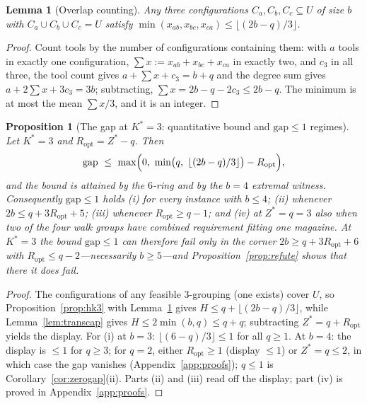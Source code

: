\documentclass[11pt,a4paper]{article}
\theoremstyle{plain}
\newtheorem{lemma}{Lemma}
\newtheorem{proposition}{Proposition}
\theoremstyle{definition}
\theoremstyle{remark}
\newcommand{\U}{U}
\newcommand{\Kst}{K^{\ast}}
\newcommand{\Zst}{Z^{\ast}}
\begin{document}
\begin{lemma}[Overlap counting]\label{lem:overlap}
Any three configurations $C_a,C_b,C_c\subseteq\U$ of size $b$ with
$C_a\cup C_b\cup C_c=\U$ satisfy
$\min(x_{ab},x_{bc},x_{ca})\le\lfloor(2b-q)/3\rfloor$.
\end{lemma}
\begin{proof}
Count tools by the number of configurations containing them: with $a$ tools in
exactly one configuration, $\sum x:=x_{ab}+x_{bc}+x_{ca}$ in exactly two, and
$c_3$ in all three, the tool count gives $a+\sum x+c_3=b+q$ and the degree sum
gives $a+2\sum x+3c_3=3b$; subtracting, $\sum x=2b-q-2c_3\le2b-q$. The minimum is
at most the mean $\sum x/3$, and it is an integer.
\end{proof}

\begin{proposition}[The gap at $\Kst=3$: quantitative bound and
$\mathrm{gap}\le1$ regimes]\label{prop:k3}
Let $\Kst=3$ and $R_{\mathrm{opt}}=\Zst-q$. Then
\[
  \mathrm{gap}\ \le\ \max\Bigl(0,\ \min\bigl(q,\
  \lfloor(2b-q)/3\rfloor\bigr)-R_{\mathrm{opt}}\Bigr),
\]
and the bound is attained by the $6$-ring and by the $b=4$ extremal witness.
Consequently $\mathrm{gap}\le1$ holds
(i) for \emph{every} instance with $b\le4$;
(ii) whenever $2b\le q+3R_{\mathrm{opt}}+5$;
(iii) whenever $R_{\mathrm{opt}}\ge q-1$; and
(iv) at $\Zst=q=3$ also when two of the four walk groups have combined
requirement fitting one magazine.
At $\Kst=3$ the bound $\mathrm{gap}\le1$ can therefore fail only in the corner
$2b\ge q+3R_{\mathrm{opt}}+6$ with $R_{\mathrm{opt}}\le q-2$---necessarily
$b\ge5$---and Proposition~\ref{prop:refute} shows that there it does fail.
\end{proposition}
\begin{proof}
The configurations of any feasible $3$-grouping (one exists) cover $\U$, so
Proposition~\ref{prop:hk3} with Lemma~\ref{lem:overlap} gives
$H\le q+\lfloor(2b-q)/3\rfloor$, while Lemma~\ref{lem:transcap} gives
$H\le2\min(b,q)\le q+q$; subtracting $\Zst=q+R_{\mathrm{opt}}$ yields the display.
For (i) at $b=3$: $\lfloor(6-q)/3\rfloor\le1$ for all $q\ge1$. At $b=4$: the
display is $\le1$ for $q\ge3$; for $q=2$, either $R_{\mathrm{opt}}\ge1$ (display
$\le1$) or $\Zst=q\le2$, in which case the gap vanishes (Appendix~\ref{app:proofs});
$q\le1$ is Corollary~\ref{cor:zerogap}(ii). Parts (ii) and (iii) read off the
display; part (iv) is proved in Appendix~\ref{app:proofs}.
\end{proof}
\end{document}
